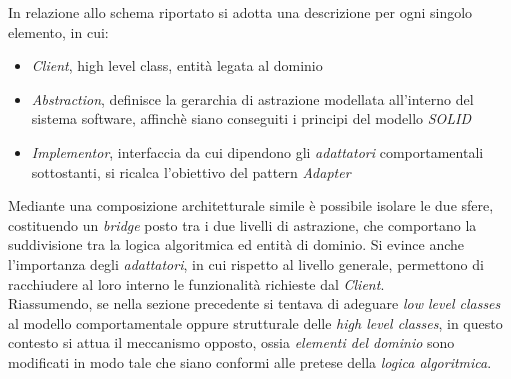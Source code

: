 \documentclass{article}
\begin{document}
In relazione allo schema riportato si adotta una descrizione per ogni singolo elemento, in cui:
\begin{itemize}[label={-}]
    \itemsep0em
    \item \textit{Client}, high level class, entità legata al dominio
    \item \textit{Abstraction}, definisce la gerarchia di astrazione modellata all'interno del sistema software, affinchè siano conseguiti i principi del modello \textit{SOLID}
    \item \textit{Implementor}, interfaccia da cui dipendono gli \textit{adattatori} comportamentali sottostanti, si ricalca l'obiettivo del pattern \textit{Adapter}
\end{itemize}
Mediante una composizione architetturale simile è possibile isolare le due sfere, costituendo un \textit{bridge} posto tra i due livelli di astrazione, che comportano la suddivisione tra la logica algoritmica ed entità di dominio. Si evince anche l'importanza degli \textit{adattatori}, in cui rispetto al livello generale, permettono di racchiudere al loro interno le funzionalità richieste dal \textit{Client}.\vspace*{7pt}\\
Riassumendo, se nella sezione precedente si tentava di adeguare \textit{low level classes} al modello comportamentale oppure strutturale delle \textit{high level classes}, in questo contesto si attua il meccanismo opposto, ossia \textit{elementi del dominio} sono modificati in modo tale che siano conformi alle pretese della \textit{logica algoritmica}.
\end{document}
